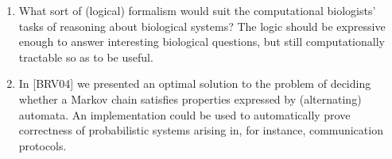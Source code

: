 \documentclass{article}
\theoremstyle{plain} \numberwithin{equation}{section}
\theoremstyle{definition}
\begin{document}
\begin{enumerate}
\item
What sort of (logical) formalism would suit the computational biologists' tasks of reasoning about biological systems? The logic should be expressive enough to answer interesting biological questions, but still computationally tractable so as to be useful.

\item In [BRV04] we presented an optimal solution to the problem of deciding whether a Markov chain satisfies properties expressed by (alternating) automata. An implementation could be used to automatically prove correctness of probabilistic systems arising in, for instance, communication protocols.
\end{enumerate}
\end{document}
